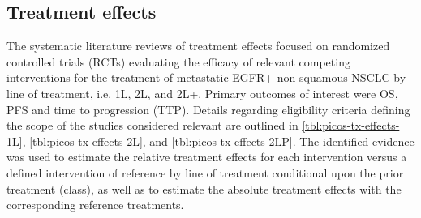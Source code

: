 \documentclass[11pt,final,fleqn]{article}\usepackage[]{graphicx}\usepackage[]{color}
\theoremstyle{plain}
\begin{document}
{\begin{appendices}
\subsection{Treatment effects}

The systematic literature reviews of treatment effects focused on randomized controlled trials (RCTs) evaluating the efficacy of relevant competing interventions for the treatment of metastatic EGFR+ non-squamous NSCLC by line of treatment, i.e. 1L, 2L, and 2L+. Primary outcomes of interest were OS, PFS and time to progression (TTP). Details regarding eligibility criteria defining the scope of the studies considered relevant are outlined in \autoref{tbl:picos-tx-effects-1L}, \autoref{tbl:picos-tx-effects-2L}, and \autoref{tbl:picos-tx-effects-2LP}. The identified evidence was used to estimate the relative treatment effects for each intervention versus a defined intervention of reference by line of treatment conditional upon the prior treatment (class), as well as to estimate the absolute treatment effects with the corresponding reference treatments.



\end{appendices}}
\end{document}
